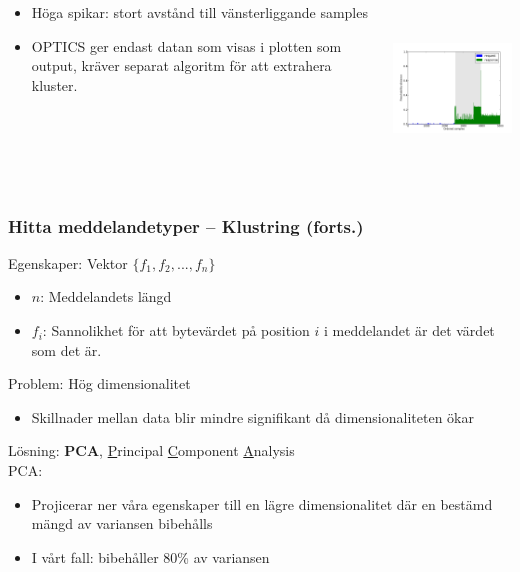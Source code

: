 \documentclass[xetex, 8pt]{beamer}
\begin{document}
\begin{frame}
\begin{columns}[t]
\begin{column}[T]{6cm}
\begin{itemize}
                    \item Höga spikar: stort avstånd till vänsterliggande samples
                    \item OPTICS ger endast datan som visas i plotten som output,
                        kräver separat algoritm för att extrahera kluster.
                \end{itemize}
            \end{column}
            \begin{column}[T]{6cm}
                \includegraphics[height=4.5cm]{img/hierextr.pdf}
            \end{column}
        \end{columns}
    \end{frame}
    \begin{frame}
        \frametitle{Hitta meddelandetyper -- Klustring (forts.)}
        Egenskaper: Vektor $\{f_1, f_2, ..., f_n\}$
        \begin{itemize}
            \item $n$: Meddelandets längd
            \item $f_i$: Sannolikhet för att bytevärdet på position $i$ i
                meddelandet är det värdet som det är.
        \end{itemize}
        \vskip20pt
        Problem: Hög dimensionalitet \\
        \begin{itemize}
            \item Skillnader mellan data blir mindre signifikant då
                dimensionaliteten ökar
        \end{itemize}
        Lösning: \textbf{PCA}, \scriptsize{\underline{P}rincipal
            \underline{C}omponent \underline{A}nalysis} \\
        PCA:
        \begin{itemize}
            \item Projicerar ner våra egenskaper till en lägre dimensionalitet
                där en bestämd mängd av variansen bibehålls
            \item I vårt fall: bibehåller 80\% av variansen
        \end{itemize}
    \end{frame}
\end{document}
